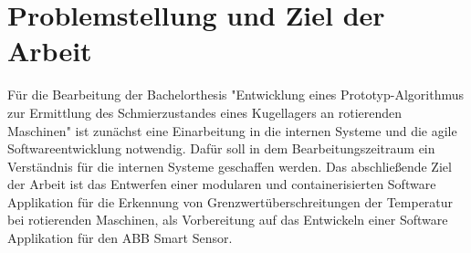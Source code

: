 \chapter{Problemstellung und Ziel der Arbeit}
Für die Bearbeitung der Bachelorthesis "Entwicklung eines Prototyp-Algorithmus zur Ermittlung des Schmierzustandes eines Kugellagers an rotierenden Maschinen" ist 
zunächst eine Einarbeitung in die internen Systeme und die agile Softwareentwicklung 
notwendig. Dafür soll in dem Bearbeitungszeitraum ein Verständnis für die internen Systeme geschaffen
werden. 
Das abschließende Ziel der Arbeit ist das Entwerfen einer modularen und containerisierten 
Software Applikation für die Erkennung von Grenzwertüberschreitungen der Temperatur bei 
rotierenden Maschinen, als Vorbereitung auf das Entwickeln einer Software Applikation für den 
ABB Smart Sensor.